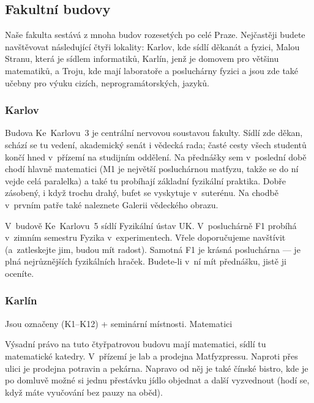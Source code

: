 \subsection{Fakultní budovy}
Naše fakulta sestává z mnoha budov rozesetých po celé Praze. Nejčastěji budete navštěvovat následující čtyři lokality: Karlov, kde sídlí děkanát a fyzici, Malou Stranu, která je sídlem informatiků, Karlín, jenž je domovem pro většinu matematiků, a Troju, kde mají laboratoře a posluchárny fyzici a jsou zde také učebny pro výuku cizích, neprogramátorských, jazyků.

\subsubsection{Karlov}



Budova Ke~Karlovu~3 je centrální nervovou soustavou fakulty. Sídlí zde
děkan, schází se tu vedení, akademický senát i vědecká rada; časté
cesty všech studentů končí hned v~přízemí na studijním oddělení.
Na přednášky sem v~poslední době chodí hlavně matematici
(M1 je největší posluchárnou matfyzu, takže se do ní vejde celá
paralelka) a také tu probíhají základní fyzikální praktika.
Dobře zásobený, i když trochu drahý, bufet se vyskytuje
v~suterénu. Na chodbě v~prvním patře také naleznete Galerii
vědeckého obrazu.

V~budově Ke~Karlovu~5 sídlí Fyzikální ústav UK. V~posluchárně F1 probíhá
v~zimním semestru  Fyzika v~experimentech.
Vřele do\-po\-ru\-ču\-je\-me navštívit (a~zatleskejte jim, budou mít
radost). Samotná F1 je krásná posluchárna --- je plná nejrůznějších
fyzikálních hraček. Budete-li v~ní mít přednášku, jistě ji
oceníte.

\subsubsection{Karlín}

 {Jsou označeny 
(K1--K12) + seminární místnosti.} {Matematici}

Výsadní právo na tuto čtyřpatrovou budovu mají matematici, sídlí
tu matematické katedry. V~přízemí je lab a prodejna Matfyzpressu.
Naproti přes ulici je prodejna potravin a pekárna. Napravo od něj
je také čínské bistro, kde je po domluvě možné si jednu přestávku
jídlo objednat a další vyzvednout (hodí se, když máte vyučování
bez pauzy na oběd).

